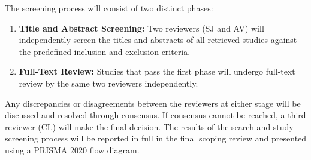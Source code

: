 The screening process will consist of two distinct phases:
\begin{enumerate}
  \item \textbf{Title and Abstract Screening:} Two reviewers (SJ and AV) will independently screen the titles and abstracts of all retrieved studies against the predefined inclusion and exclusion criteria.
  \item \textbf{Full-Text Review:} Studies that pass the first phase will undergo full-text review by the same two reviewers independently.
\end{enumerate}
Any discrepancies or disagreements between the reviewers at either stage will be discussed and resolved through consensus. If consensus cannot be reached, a third reviewer (CL) will make the final decision. The results of the search and study screening process will be reported in full in the final scoping review and presented using a PRISMA 2020 flow diagram.

